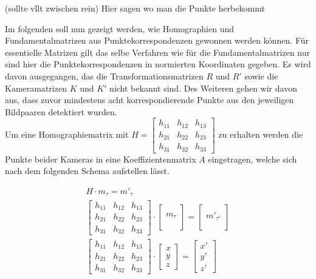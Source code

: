 (sollte vllt zwischen rein)
Hier sagen wo man die Punkte herbekommt

Im folgenden soll nun gezeigt werden, wie Homographien und Fundamentalmatrizen aus Punktekorrespondenzen gewonnen werden können. Für essentielle Matrizen gilt das selbe Verfahren wie für die Fundamentalmatrizen nur sind hier die Punktekorrespondenzen in normierten Koordinaten gegeben. Es wird davon ausgegangen, das die Transformationsmatrizen $R$ und $R'$ sowie die Kameramatrizen $K$ und $K'$ nicht bekannt sind. Des Weiteren gehen wir davon aus, dass zuvor mindestens acht korrespondierende Punkte aus den jeweiligen  Bildpaaren detektiert wurden. \\


Um eine Homographiematrix mit 
$H=
\begin{bmatrix}
h_{11}&h_{12}&h_{13}\\
h_{21}&h_{22}&h_{23}\\
h_{31}&h_{32}&h_{33}
\end{bmatrix}
$ zu erhalten werden die Punkte beider Kameras in eine Koeffizientenmatrix $A$ eingetragen, welche sich nach dem folgenden Schema aufstellen lässt. 

\begin{gather}
	H\cdot m_\tau = m'_{\tau}\\
	\begin{bmatrix}
		h_{11}&h_{12}&h_{13}\\
		h_{21}&h_{22}&h_{23}\\
		h_{31}&h_{32}&h_{33}
	\end{bmatrix}
	\cdot
	\begin{bmatrix}
		\\m_\tau\\\\
	\end{bmatrix}
	=
	\begin{bmatrix}
		\\m'_{\tau'}\\\\
	\end{bmatrix}\\
	\begin{bmatrix}
		h_{11}&h_{12}&h_{13}\\
		h_{21}&h_{22}&h_{23}\\
		h_{31}&h_{32}&h_{33}
	\end{bmatrix}
	\cdot
	\begin{bmatrix}
		x\\y\\z
	\end{bmatrix}
	=
	\begin{bmatrix}
		x'\\y'\\z'
	\end{bmatrix}
\end{gather}

